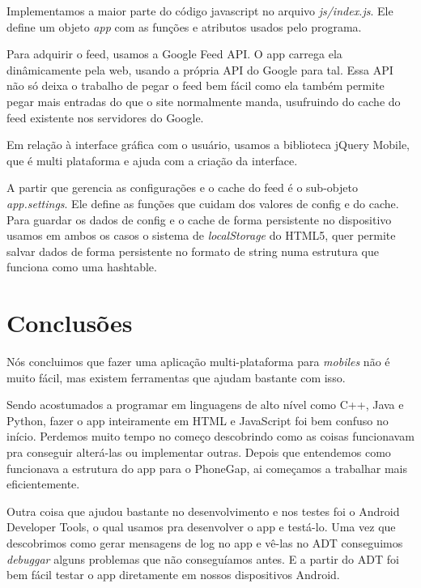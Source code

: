 Implementamos a maior parte do código javascript no arquivo \textit{js/index.js}.
Ele define um objeto \textit{app} com as funções e atributos usados pelo programa.

Para adquirir o feed, usamos a Google Feed API. O app carrega ela dinâmicamente pela web,
usando a própria API do Google para tal.
Essa API não só deixa o trabalho de pegar o feed bem fácil como ela também permite pegar mais
entradas do que o site normalmente manda, usufruindo do cache do feed existente nos servidores
do Google.

Em relação à interface gráfica com o usuário, usamos a biblioteca jQuery Mobile, que é multi
plataforma e ajuda com a criação da interface.

A partir que gerencia as configurações e o cache do feed é o sub-objeto \textit{app.settings}.
Ele define as funções que cuidam dos valores de config e do cache. Para guardar os dados de 
config e o cache de forma persistente no dispositivo usamos em ambos os casos o sistema
de \textit{localStorage} do HTML5, quer permite salvar dados de forma persistente no formato
de string numa estrutura que funciona como uma hashtable.


\section{Conclusões}
Nós concluimos que fazer uma aplicação multi-plataforma para \textit{mobiles} não é muito fácil,
mas existem ferramentas que ajudam bastante com isso.

Sendo acostumados a programar em linguagens de alto nível como C++, Java e Python, fazer o app 
inteiramente em HTML e JavaScript foi bem confuso no início. Perdemos muito tempo no começo
descobrindo como as coisas funcionavam pra conseguir alterá-las ou implementar outras.
Depois que entendemos como funcionava a estrutura do app para o PhoneGap, ai começamos a 
trabalhar mais eficientemente.

Outra coisa que ajudou bastante no desenvolvimento e nos testes foi o Android Developer Tools,
o qual usamos pra desenvolver o app e testá-lo. Uma vez que descobrimos como gerar mensagens de
log no app e vê-las no ADT conseguimos \textit{debuggar} alguns problemas que não conseguíamos 
antes. E a partir do ADT foi bem fácil testar o app diretamente em nossos dispositivos Android.


